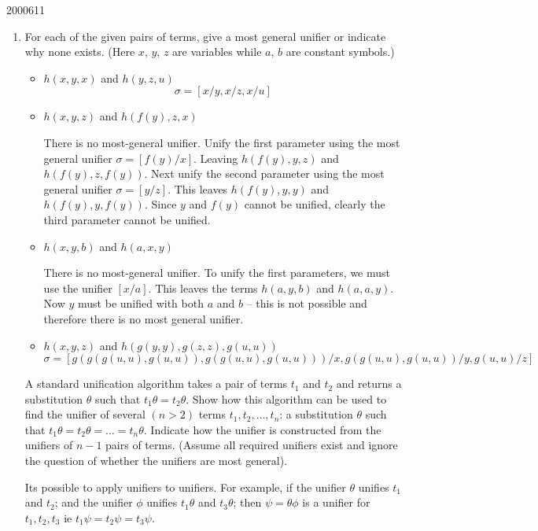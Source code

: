 \documentclass[10pt,\jkfside,a4paper]{article}
\begin{document}
\begin{examquestion}{2000}{6}{11}

\begin{enumerate}

\item For each of the given pairs of terms, give a most general unifier or
indicate why none exists. (Here $x$, $y$, $z$ are variables while $a$, $b$
are constant symbols.)

\begin{itemize}

\item $h(x, y, x)$ and $h(y, z, u)$
\[
\sigma = [x/y, x/z, x/u]
\]

\item $h(x, y, z)$ and $h(f(y), z, x)$

There is no most-general unifier. Unify the first parameter
using the most general unifier $\sigma=[f(y)/x]$. Leaving $h(f(y), y, z)$
and $h(f(y), z, f(y))$. Next unify the second parameter using the most
general unifier $\sigma = [y/z]$. This leaves $h(f(y), y, y)$ and $h(f(y),
y, f(y))$. Since $y$ and $f(y)$ cannot be unified, clearly the third
parameter cannot be unified.

\item $h(x, y, b)$ and $h(a, x, y)$

There is no most-general unifier. To unify the first parameters, we must use
the unifier $[x/a]$. This leaves the terms $h(a, y, b)$ and $h(a, a, y)$.
Now $y$ must be unified with both $a$ and $b$ -- this is not possible and
therefore there is no most general unifier.

\item $h(x, y, z)$ and $h(g(y, y), g(z, z), g(u, u))$
\[
\sigma =
[
g(g(g(u, u), g(u, u)), g(g(u, u), g(u, u)))/x, g(g(u, u), g(u, u))/y, g(u, u)/z
]
\]

\end{itemize}

A standard unification algorithm takes a pair of terms $t_1$ and $t_2$ and
returns a substitution $\theta$ such that $t_1\theta = t_2\theta$. Show how
this algorithm can be used to find the unifier of several $(n > 2)$ terms
$t_1, t_2, \dots, t_n$: a substitution $\theta$ such that $t_1\theta =
t_2\theta = \dots = t_n \theta$. Indicate how the unifier is constructed
from the unifiers of $n - 1$ pairs of terms. (Assume all required unifiers
exist and ignore the question of whether the unifiers are most general).

Its possible to apply unifiers to unifiers. For example, if the unifier
$\theta$ unifies $t_1$ and $t_2$; and the unifier $\phi$ unifies $t_1\theta$
and $t_3 \theta$; then $\psi = \theta \phi$ is a unifier for $t_1, t_2, t_3$
ie $t_1\psi = t_2\psi = t_3\psi $.


\end{enumerate}
\end{examquestion}
\end{document}
